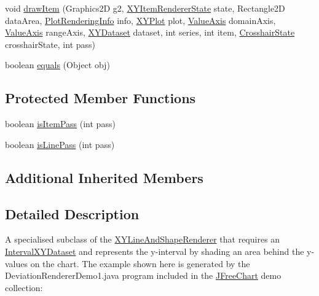 \begin{DoxyCompactItemize}
void \mbox{\hyperlink{classorg_1_1jfree_1_1chart_1_1renderer_1_1xy_1_1_deviation_renderer_aaf296dfa0e63a160132fd5e4d12f6422}{draw\+Item}} (Graphics2D g2, \mbox{\hyperlink{classorg_1_1jfree_1_1chart_1_1renderer_1_1xy_1_1_x_y_item_renderer_state}{X\+Y\+Item\+Renderer\+State}} state, Rectangle2D data\+Area, \mbox{\hyperlink{classorg_1_1jfree_1_1chart_1_1plot_1_1_plot_rendering_info}{Plot\+Rendering\+Info}} info, \mbox{\hyperlink{classorg_1_1jfree_1_1chart_1_1plot_1_1_x_y_plot}{X\+Y\+Plot}} plot, \mbox{\hyperlink{classorg_1_1jfree_1_1chart_1_1axis_1_1_value_axis}{Value\+Axis}} domain\+Axis, \mbox{\hyperlink{classorg_1_1jfree_1_1chart_1_1axis_1_1_value_axis}{Value\+Axis}} range\+Axis, \mbox{\hyperlink{interfaceorg_1_1jfree_1_1data_1_1xy_1_1_x_y_dataset}{X\+Y\+Dataset}} dataset, int series, int item, \mbox{\hyperlink{classorg_1_1jfree_1_1chart_1_1plot_1_1_crosshair_state}{Crosshair\+State}} crosshair\+State, int pass)
\item 
boolean \mbox{\hyperlink{classorg_1_1jfree_1_1chart_1_1renderer_1_1xy_1_1_deviation_renderer_ac2805d065b3d7ae94cc66e6ca49aa773}{equals}} (Object obj)
\end{DoxyCompactItemize}
\subsection*{Protected Member Functions}
\begin{DoxyCompactItemize}
\item 
boolean \mbox{\hyperlink{classorg_1_1jfree_1_1chart_1_1renderer_1_1xy_1_1_deviation_renderer_afc3467f976aacc73e730ebeedf5ea704}{is\+Item\+Pass}} (int pass)
\item 
boolean \mbox{\hyperlink{classorg_1_1jfree_1_1chart_1_1renderer_1_1xy_1_1_deviation_renderer_ad895205c8ee84b5b2bbdc4bb388b7355}{is\+Line\+Pass}} (int pass)
\end{DoxyCompactItemize}
\subsection*{Additional Inherited Members}


\subsection{Detailed Description}
A specialised subclass of the \mbox{\hyperlink{classorg_1_1jfree_1_1chart_1_1renderer_1_1xy_1_1_x_y_line_and_shape_renderer}{X\+Y\+Line\+And\+Shape\+Renderer}} that requires an \mbox{\hyperlink{}{Interval\+X\+Y\+Dataset}} and represents the y-\/interval by shading an area behind the y-\/values on the chart. The example shown here is generated by the {\ttfamily Deviation\+Renderer\+Demo1.\+java} program included in the \mbox{\hyperlink{classorg_1_1jfree_1_1chart_1_1_j_free_chart}{J\+Free\+Chart}} demo collection\+: ~\newline
~\newline
 

